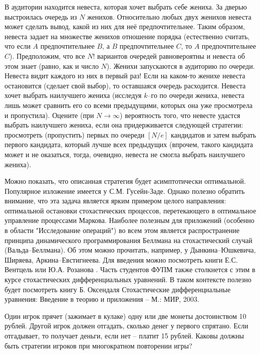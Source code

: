  \begin{problem} 
 В аудитории находится невеста, которая хочет выбрать себе жениха. За дверью выстроилась очередь из $N$ женихов. Относительно любых 
 двух женихов невеста может сделать вывод, какой из них для неё предпочтительнее. Таким образом, невеста задает на множестве женихов 
 отношение порядка (естественно считать, что если $A$ предпочтительнее $B$, а $B$ предпочтительнее $C$, то $A$ предпочтительнее $C$). 
 Предположим, что все $N!$ вариантов очередей равновероятны и невеста об этом знает (равно, как и число $N$). Женихи запускаются 
 в аудиторию по очереди. Невеста видит каждого из них в первый раз! Если на каком-то женихе невеста остановится (сделает свой выбор), 
 то оставшаяся очередь расходится. Невеста хочет выбрать наилучшего жениха (исследуя $k$–го по очереди жениха, невеста лишь может 
 сравнить его со всеми предыдущими, которых она уже просмотрела и пропустила). Оцените (при $N\to\infty$) вероятность того, что невесте 
 удастся выбрать наилучшего жениха, если она придерживается следующей стратегии: просмотреть (пропустить) первых по очереди $[N/e]$ 
 кандидатов и затем выбрать первого кандидата, который лучше всех предыдущих (впрочем, такого кандидата может и не оказаться, тогда, 
 очевидно, невеста не смогла выбрать наилучшего жениха). 
 \end{problem}
 \begin{remark}
 Можно показать, что описанная стратегия будет асимптотически оптимальной. Популярное изложение имеется у С.М. Гусейн-Заде. Однако полезно обратить внимание, что эта задача является ярким примером целого направления: оптимальной остановки стохастических процессов, перетекающего в оптимальное управление процессами Маркова. Наиболее полезным для приложений (особенно в области "Исследование операций") во всем этом является распространение принципа динамического программирования Беллмана на стохастический случай ({ Вальда--Беллмана}). Об этом можно прочитать, например, у Дынкина--Юшкевича, Ширяева, Аркина--Евстигнеева. Для введения можно посмотреть книги Е.С. Вентцель или Ю.А. Розанова \cite{6}. Часть студентов ФУПМ также столкнется с этим в курсе стохастических дифференциальных уравнений. В таком контексте полезно будет посмотреть книгу Б. Оксендаля Стохастические дифференциальные уравнения: Введение в теорию и приложения -- М.: МИР, 2003. 
 \end{remark}

\begin{problem}
Один игрок прячет (зажимает в кулаке) одну или две монеты достоинством 10 рублей. Другой игрок должен отгадать, сколько денег у первого спрятано. Если отгадывает, то получает деньги, если нет -- платит 15 рублей. Каковы  должны быть стратегии игроков при многократном повторении игры?

\end{problem}

